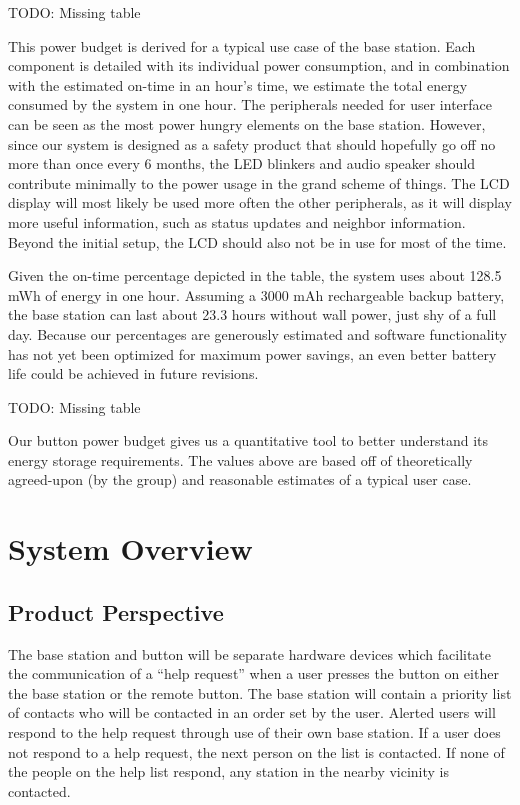\documentclass[journal]{IEEEtran}
\begin{document}
TODO: Missing table

This power budget is derived for a typical use case of the base station.  Each component is detailed with its individual power consumption, and in combination with the estimated on-time in an hour’s time, we estimate the total energy consumed by the system in one hour.  The peripherals needed for user interface can be seen as the most power hungry elements on the base station.  However, since our system is designed as a safety product that should hopefully go off no more than once every 6 months, the LED blinkers and audio speaker should contribute minimally to the power usage in the grand scheme of things.  The LCD display will most likely be used more often the other peripherals, as it will display more useful information, such as status updates and neighbor information.  Beyond the initial setup, the LCD should also not be in use for most of the time.

Given the on-time percentage depicted in the table, the system uses about 128.5 mWh of energy in one hour. Assuming a 3000 mAh rechargeable backup battery, the base station can last about 23.3 hours without wall power, just shy of a full day. Because our percentages are generously estimated and software functionality has not yet been optimized for maximum power savings, an even better battery life could be achieved in future revisions.

TODO: Missing table

Our button power budget gives us a quantitative tool to better understand its energy storage requirements.  The values above are based off of theoretically agreed-upon (by the group) and reasonable estimates of a typical user case.

\section{System Overview}

\subsection{Product Perspective}
The base station and button will be separate hardware devices which facilitate the communication of a “help request” when a user presses the button on either the base station or the remote button.  The base station will contain a priority list of contacts who will be contacted in an order set by the user.  Alerted users will respond to the help request through use of their own base station.  If a user does not respond to a help request, the next person on the list is contacted.  If none of the people on the help list respond, any station in the nearby vicinity is contacted.
\end{document}
